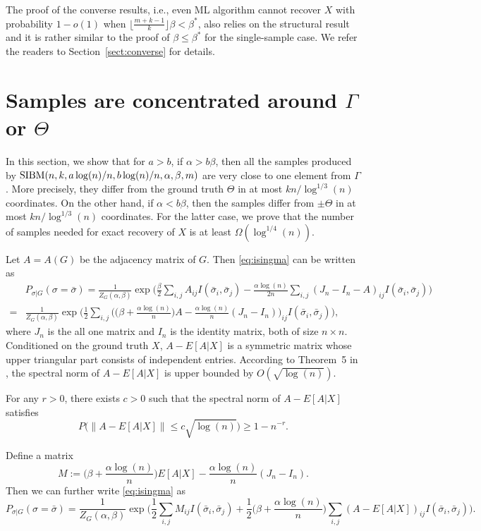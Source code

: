 \documentclass{article}
\begin{document}
The proof of the converse results, i.e., even ML algorithm cannot recover $X$ with probability $1-o(1)$ when $\lfloor \frac{m+k-1}{k} \rfloor \beta < \beta^\ast$, also relies on the structural result and it is rather similar to the proof of $\beta\le\beta^\ast$ for the single-sample case. We refer the readers to Section~\ref{sect:converse} for details.

\section{Samples are concentrated around $\Gamma$ or $\Theta$} \label{sect:aln}
In this section, we show that for $a>b$, if $\alpha>b\beta$, then all the samples produced by $\SIBM(n, k,\linebreak[4]
a\log(n)/n, b\log(n)/n,\alpha,\beta,m)$ are very close to one element from $\Gamma$. More precisely, they differ from the ground truth $\Theta$ in at most $kn/\log^{1/3}(n)$ coordinates.
On the other hand, if $\alpha<b\beta$, then the samples differ from  $\pm \Theta$ in at most $kn/\log^{1/3}(n)$ coordinates.
For the latter case, we prove that the number of samples needed for exact recovery of $X$ is at least $\Omega(\log^{1/4}(n))$.

Let $A=A(G)$ be the adjacency matrix of $G$. Then \eqref{eq:isingma} can be written as
\begin{align*}
& P_{\sigma|G}(\sigma=\bar{\sigma})=\frac{1}{Z_G(\alpha,\beta)}
\exp\Big(\frac{\beta}{2} \sum_{i,j} A_{ij} I(\bar{\sigma}_i,\bar{\sigma}_j)
-\frac{\alpha\log(n)}{2n} \sum_{i,j} (J_n-I_n-A)_{ij} I(\bar{\sigma}_i, \bar{\sigma}_j)
\Big)  \\
= & \frac{1}{Z_G(\alpha,\beta)}
\exp\Big( \frac{1}{2} \sum_{i,j} \Big( \big(\beta+\frac{\alpha\log(n)}{n} \big) A
-\frac{\alpha\log(n)}{n} (J_n-I_n) \Big)_{ij} I(\bar{\sigma}_i,\bar{\sigma}_j)
\Big),
\end{align*}
where $J_n$ is the all one matrix and $I_n$ is the identity matrix, both of size $n\times n$.
Conditioned on the ground truth $X$,
$A-E[A|X]$ is a symmetric matrix whose upper triangular part consists of independent entries. According to Theorem~5 in \cite{Hajek16}, the spectral norm of $A-E[A|X]$ is upper bounded by $O(\sqrt{\log(n)})$.
\begin{theorem} \label{thm:a2}
For any $r>0$, there exists $c>0$ such that the spectral norm of $A-E[A|X]$ satisfies
$$
P\big(\|A-E[A|X]\| \le c\sqrt{\log(n)} \big)\ge 1-n^{-r} .
$$
\end{theorem}
Define a matrix
$$
M:= \big(\beta+\frac{\alpha\log(n)}{n} \big) E[A|X]
-\frac{\alpha\log(n)}{n} (J_n-I_n).
$$
Then we can further write \eqref{eq:isingma}
as
\begin{equation} \label{eq:M}
P_{\sigma|G}(\sigma=\bar{\sigma})
= \frac{1}{Z_G(\alpha,\beta)}
\exp\Big( \frac{1}{2} \sum_{i,j}M_{ij} I(\bar{\sigma}_i, \bar{\sigma}_j) + \frac{1}{2}\big(\beta+\frac{\alpha\log(n)}{n} \big)  \sum_{i,j}  (A-E[A|X])_{ij}
 I(\bar{\sigma}_i, \bar{\sigma}_j)  
\Big)  .
\end{equation}
\end{document}
